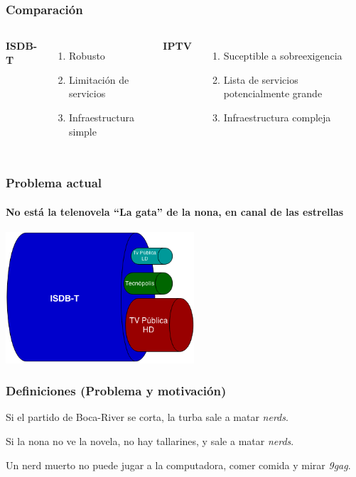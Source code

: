 \documentclass[a4paper,11pt]{beamer}
\begin{document}
\begin{frame}
\frametitle{Comparación}
\begin{columns}[c,t] %

\textbf{ISDB-T}
\begin{enumerate}
\item Robusto
\item Limitación de servicios
\item Infraestructura simple
\end{enumerate}

\textbf{IPTV}
\begin{enumerate}
\item Suceptible a sobreexigencia
\item Lista de servicios potencialmente grande
\item Infraestructura compleja
\end{enumerate}
\end{columns}
\end{frame}


\begin{frame}
\frametitle{Problema actual}
\framesubtitle{No está la telenovela ``La gata'' de la nona, en canal de las estrellas}
\begin{center}
\includegraphics[width=7cm]{isdbtcable_regular.png}
\end{center}
\end{frame}


\begin{frame}
\frametitle{Definiciones (Problema y motivación)}
\begin{lemma}
Si el partido de Boca-River se corta, la turba sale a matar \emph{nerds}.
\end{lemma}
\begin{lemma}
Si la nona no ve la novela, no hay tallarines, y sale a matar \emph{nerds}.
\end{lemma}
\begin{lemma}
Un nerd muerto no puede jugar a la computadora, comer comida y mirar \emph{9gag}.
\end{lemma}
\end{frame}
\end{document}
